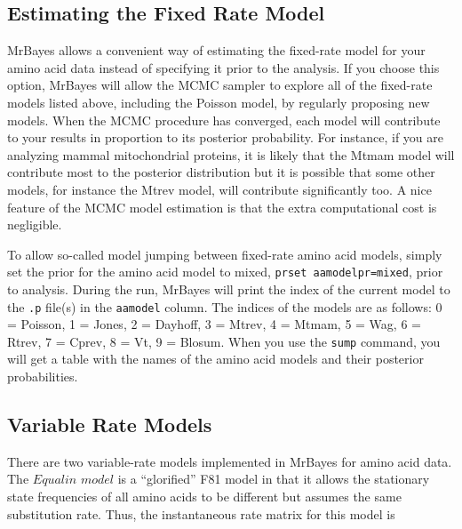 \documentclass[12pt]{book}
\begin{document}
\subsection{Estimating the Fixed Rate Model}
\label{estimatingTheFixedRateModel}

MrBayes allows a convenient way of estimating the fixed-rate model for your amino acid data instead
of specifying it prior to the analysis. If you choose this option, MrBayes will allow the MCMC
sampler to explore all of the fixed-rate models listed above, including the Poisson model, by
regularly proposing new models. When the MCMC procedure has converged, each model will contribute
to your results in proportion to its posterior probability. For instance, if you are analyzing
mammal mitochondrial proteins, it is likely that the Mtmam model will contribute most to the
posterior distribution but it is possible that some other models, for instance the Mtrev model,
will contribute significantly too. A nice feature of the MCMC model estimation is that the extra
computational cost is negligible.

To allow so-called model jumping between fixed-rate amino acid models, simply set the prior for the
amino acid model to mixed, \texttt{prset aamodelpr=mixed}, prior to analysis. During the run,
MrBayes will print the index of the current model to the \texttt{.p} file(s) in the
\texttt{aamodel} column. The indices of the models are as follows: 0 = Poisson, 1 = Jones, 2 =
Dayhoff, 3 = Mtrev, 4 = Mtmam, 5 = Wag, 6 = Rtrev, 7 = Cprev, 8 = Vt, 9 = Blosum. When you use the
\texttt{sump} command, you will get a table with the names of the amino acid models and their
posterior probabilities.

\subsection{Variable Rate Models}

There are two variable-rate models implemented in MrBayes for amino acid data. The $Equalin$
$model$ is a ``glorified'' F81 model in that it allows the stationary state frequencies of all
amino acids to be different but assumes the same substitution rate. Thus, the instantaneous rate
matrix for this model is
\end{document}
